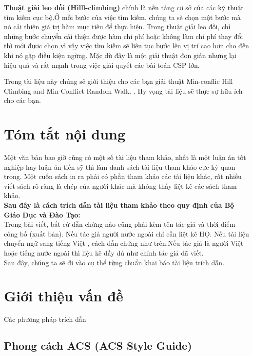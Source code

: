 \documentclass{hcmutarticle}
\begin{document}
\textbf{Thuật giải leo đồi (Hilll-climbing)}
 chính là nền tảng cơ sở của các ký thuật tìm kiếm cục bộ.Ở mỗi bước của việc tìm kiếm, chúng ta sẽ chọn một bước mà nó cải thiện giá trị hàm mục tiêu để thực hiện. Trong thuật giải leo đồi, chỉ những bước chuyển cải thiện được hàm chi phí hoặc không làm chi phí thay đổi thì mới đươc chọn vì vậy việc tìm kiếm sẽ liên tục bước lên vị trí cao hơn cho đến khi nó gặp điều kiện ngừng. Mặc dù đây là một giải thuật đơn giản nhưng lại hiệu quả  và rất mạnh trong việc giải quyết các bài toán CSP lớn.



 Trong tài liệu này chúng sẽ giới thiệu cho các bạn giải thuật Min-conflic Hill Climbing and Min-Conflict Random Walk.
. Hy vọng tài liệu sẽ thực sự hữu ích cho các bạn.\\

\newpage

\section{Tóm tắt nội dung}\label{survey}
Một văn bản bao giờ cũng có một số tài liệu tham khảo, nhất là một luận án tốt nghiệp hay luận án tiến sỹ thì làm danh sách tài liệu tham khảo cực kỳ quan trong. Một cuốn sách in ra phải có phần tham khảo các tài liệu khác, rất nhiều viết sách rõ ràng là chép của người khác mà không thấy liệt kê các sách tham khảo.\\

{\bfseries  Sau đây là cách trích dẫn tài liệu tham khảo theo quy định của Bộ Giáo Dục và Đào Tạo:}\\

Trong bài viết, bất cứ dẫn chứng nào cũng phải kèm tên tác giả và thời điểm công bố (xuất bản). Nếu tác giả người nước ngoài chỉ cần liệt kê HỌ. Nếu tài liệu chuyển ngữ sang tiếng Việt , cách dẫn chứng như trên.Nếu tác giả là người Việt hoặc tiếng nước ngoài thì liệu kê đầy đủ như chính tác giả đã viết.\\
Sau đây, chúng ta sẽ đi vào cụ thể từng chuẩn khai báo tài liệu trích dẫn.
\section{Giới thiệu vấn đề }\label{dev}
Các phương pháp trích dẫn

\subsection{Phong cách ACS (ACS Style Guide)}
\end{document}

